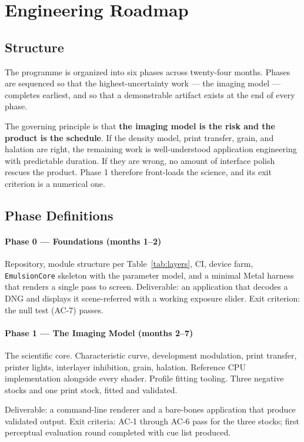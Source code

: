 \section{Engineering Roadmap}
\label{sec:roadmap}

\subsection{Structure}

The programme is organized into six phases across twenty-four months. Phases
are sequenced so that the highest-uncertainty work --- the imaging model ---
completes earliest, and so that a demonstrable artifact exists at the end of
every phase.

The governing principle is that \textbf{the imaging model is the risk and the
product is the schedule}. If the density model, print transfer, grain, and
halation are right, the remaining work is well-understood application
engineering with predictable duration. If they are wrong, no amount of interface
polish rescues the product. Phase 1 therefore front-loads the science, and its
exit criterion is a numerical one.

\subsection{Phase Definitions}

\paragraph{Phase 0 --- Foundations (months 1--2)}
Repository, module structure per Table~\ref{tab:layers}, CI, device farm,
\texttt{EmulsionCore} skeleton with the parameter model, and a minimal Metal
harness that renders a single pass to screen. Deliverable: an application that
decodes a DNG and displays it scene-referred with a working exposure slider.
Exit criterion: the null test (AC-7) passes.

\paragraph{Phase 1 --- The Imaging Model (months 2--7)}
The scientific core. Characteristic curve, development modulation, print
transfer, printer lights, interlayer inhibition, grain, halation. Reference CPU
implementation alongside every shader. Profile fitting tooling. Three negative
stocks and one print stock, fitted and validated.

Deliverable: a command-line renderer and a bare-bones application that produce
validated output. Exit criteria: AC-1 through AC-6 pass for the three stocks;
first perceptual evaluation round completed with cue list produced.

